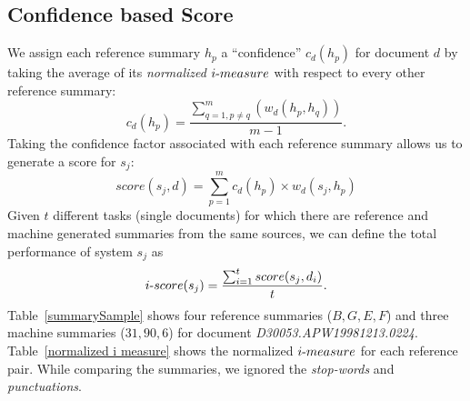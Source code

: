 \documentclass[a4paper]{report}
\begin{document}
\subsection{Confidence based Score}
\label{localApproach}
We assign each reference summary $h_p$ a ``confidence'' $c_d{(h_p)}$ for document $d$ by taking the average of its \emph{normalized $i\hbox{-}measure$} with respect to every other reference summary:
\begin{equation}
c_d(h_p)  =  \frac{\sum_{q=1, p \ne q}^m(w_d(h_p, h_q))}{m-1}.
\end{equation}
Taking the confidence factor associated with each reference summary allows us to generate a score for $s_j$:
\begin{equation}
score(s_j, d) = \sum_{p=1}^mc_d{(h_p)} \times w_d(s_j,h_p)
\label{localscore}
\end{equation}
Given $t$ different tasks (single documents) for which there are reference and machine generated summaries from the same sources,  we can define the total performance of system $s_j$ as
\begin{equation}
i\hbox{-}score(s_j) =\frac{ \sum_{i=1}^t score(s_j, d_i)}{t}.
\label{totalscore}
\end{equation}
Table~\ref{summarySample} shows four reference summaries ($B,G,E,F$) and three machine summaries ($31, 90, 6$)  for document \emph{D30053.APW19981213.0224}. Table~\ref{normalized i measure} shows the normalized $i\hbox{-}measure$ for each reference pair. While comparing the summaries, we ignored the \emph{stop-words} and \emph{punctuations}. 
\begin{table}[H]
\end{table}
\end{document}

